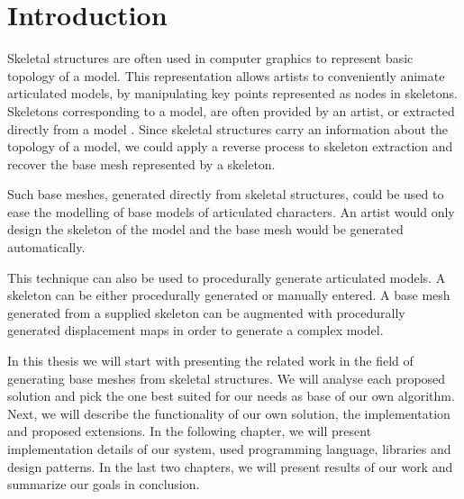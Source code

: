 \chapter*{Introduction}

Skeletal structures are often used in computer graphics to represent basic topology of a model.
This representation allows artists to conveniently animate articulated models, by manipulating key points represented as nodes in skeletons.
Skeletons corresponding to a model, are often provided by an artist, or extracted directly from a model \cite{laplac}.
Since skeletal structures carry an information about the topology of  a model, we could apply a reverse process to skeleton extraction and recover the base mesh represented by a skeleton.

Such base meshes, generated directly from skeletal structures, could be used to ease the modelling of base models of articulated characters.
An artist would only design the skeleton of the model and the base mesh would be generated automatically.

This technique can also be used to procedurally generate articulated models.
A skeleton can be either procedurally generated or manually entered.
A base mesh generated from a supplied skeleton can be augmented with procedurally generated displacement maps in order to generate a complex model.

In this thesis we will start with presenting the related work in the field of generating base meshes from skeletal structures.
We will analyse each proposed solution and pick the one best suited for our needs as base of our own algorithm.
Next, we will describe the functionality of our own solution, the implementation and proposed extensions.
In the following chapter, we will present implementation details of our system, used programming language, libraries and design patterns.
In the last two chapters, we will present results of our work and summarize our goals in conclusion.